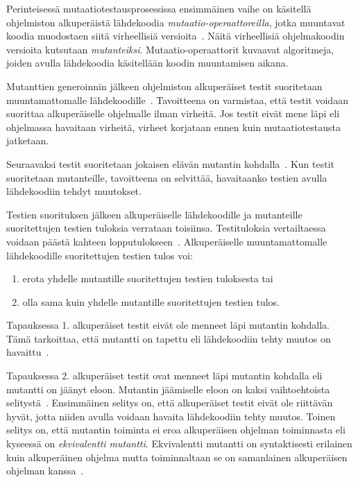 \documentclass[finnish, grading]{tktltiki2}
\theoremstyle{definition}
\theoremstyle{remark}
\begin{document}
Perinteisessä mutaatiotestausprosessissa ensimmäinen vaihe on käsitellä ohjelmiston alkuperäistä lähdekoodia \textit{mutaatio-operaattoreilla}, jotka muuntavat koodia muodostaen siitä virheellisiä versioita~\cite[s. 869]{Ma:Harrold:Kwon:2006}. Näitä virheellisiä ohjelmakoodin versioita kutsutaan \textit{mutanteiksi}. Mutaatio-operaattorit kuvaavat algoritmeja, joiden avulla lähdekoodia käsitellään koodin muuntamisen aikana.

Mutanttien generoinnin jälkeen ohjelmiston alkuperäiset testit suoritetaan muuntamattomalle lähdekoodille~\cite[s. 652]{Jia:Harman:2011}. Tavoitteena on varmistaa, että testit voidaan suorittaa alkuperäiselle ohjelmalle ilman virheitä. Jos testit eivät mene läpi eli ohjelmassa havaitaan virheitä, virheet korjataan ennen kuin mutaatiotestausta jatketaan. 

Seuraavaksi testit suoritetaan jokaisen elävän mutantin kohdalla~\cite[s. 35]{Offutt:Untch:2001}. Kun testit suoritetaan mutanteille, tavoitteena on selvittää, havaitaanko testien avulla lähdekoodiin tehdyt muutokset. 

Testien suorituksen jälkeen alkuperäiselle lähdekoodille ja mutanteille suoritettujen testien tuloksia verrataan toisiinsa. Testituloksia vertailtaessa voidaan päästä kahteen lopputulokseen~\cite[s. 36]{DeMillo:Lipton:Sayward:1978}. Alkuperäiselle muuntamattomalle lähdekoodille suoritettujen testien tulos voi: 
\begin{enumerate}
  \item erota yhdelle mutantille suoritettujen testien tuloksesta tai
  \item olla sama kuin yhdelle mutantille suoritettujen testien tulos.
\end{enumerate}

Tapauksessa 1. alkuperäiset testit eivät ole menneet läpi mutantin kohdalla. Tämä tarkoittaa, että mutantti on tapettu eli lähdekoodiin tehty muutos on havaittu~\cite[s. 36]{DeMillo:Lipton:Sayward:1978}.

Tapauksessa 2. alkuperäiset testit ovat menneet läpi mutantin kohdalla eli mutantti on jäänyt eloon. Mutantin jäämiselle eloon on kaksi vaihtoehtoista selitystä~\cite[s. 36]{DeMillo:Lipton:Sayward:1978}. Ensimmäinen selitys on, että alkuperäiset testit eivät ole riittävän hyvät, jotta niiden avulla voidaan havaita lähdekoodiin tehty muutos. Toinen selitys on, että mutantin toiminta ei eroa alkuperäisen ohjelman toiminnasta eli kyseessä on \textit{ekvivalentti mutantti}. Ekvivalentti mutantti on syntaktisesti erilainen kuin alkuperäinen ohjelma mutta toiminnaltaan se on samanlainen alkuperäisen ohjelman kanssa~\cite[s. 652]{Jia:Harman:2011}.
\end{document}
